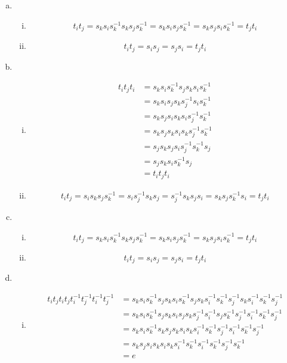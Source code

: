 \documentclass[11pt]{amsart}
\theoremstyle{definition}
\begin{document}
\begin{enumerate}[a)]
\item
\begin{enumerate}[i)]
\item $$t_it_j = s_ks_is_k^{-1}s_ks_js_k^{-1} = s_ks_is_js_k^{-1} = s_ks_js_is_k^{-1} = t_jt_i$$
\item $$t_it_j = s_is_j = s_js_i = t_jt_i$$
\end{enumerate}
\item
\begin{enumerate}[i)]
\item
\begin{align*}
t_it_jt_i &= s_ks_is_k^{-1}s_js_ks_is_k^{-1}\\
&= s_ks_is_js_ks_j^{-1}s_is_k^{-1}\\
&= s_ks_js_is_ks_is_j^{-1}s_k^{-1}\\
&= s_ks_js_ks_is_ks_j^{-1}s_k^{-1}\\
&= s_js_ks_js_is_j^{-1}s_k^{-1}s_j\\
&= s_js_ks_is_k^{-1}s_j\\
&= t_it_jt_i
\end{align*}
\item $$t_it_j = s_is_ks_js_k^{-1} = s_is_j^{-1}s_ks_j = s_j^{-1}s_ks_js_i = s_ks_js_k^{-1}s_i = t_jt_i$$
\end{enumerate}
\item
\begin{enumerate}[i)]
\item $$t_it_j = s_ks_is_k^{-1}s_ks_js_k^{-1} = s_ks_is_js_k^{-1} = s_ks_js_is_k^{-1} = t_jt_i$$
\item $$t_it_j = s_is_j = s_js_i = t_jt_i$$
\end{enumerate}
\item
\begin{enumerate}[i)]
\item
\begin{align*}
t_it_jt_it_jt_i^{-1}t_j^{-1}t_i^{-1}t_j^{-1} &= s_ks_is_k^{-1}s_js_ks_is_k^{-1}s_js_ks_i^{-1}s_k^{-1}s_j^{-1}s_ks_i^{-1}s_k^{-1}s_j^{-1}\\
&=s_ks_is_k^{-1}s_js_ks_is_js_ks_j^{-1}s_i^{-1}s_js_k^{-1}s_j^{-1}s_i^{-1}s_k^{-1}s_j^{-1}\\
&=s_ks_is_k^{-1}s_ks_js_ks_is_ks_i^{-1}s_k^{-1}s_j^{-1}s_i^{-1}s_k^{-1}s_j^{-1}\\
&=s_ks_js_is_ks_is_ks_i^{-1}s_k^{-1}s_i^{-1}s_k^{-1}s_j^{-1}s_k^{-1}\\
&= e
\end{align*}
\end{enumerate}
\end{enumerate}
\end{document}
